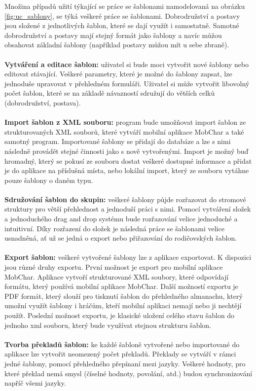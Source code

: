 \documentclass[thesis=B,czech]{resources/FITthesis}[2012/06/26]
\begin{document}
Množina případů užití týkající se práce se šablonami namodelovaná na obrázku \ref{fig:uc_sablony}, se týká veškeré práce se šablonami. Dobrodružství a postavy jsou složené z jednotlivých šablon, které se dají využít i samostatně. Samotné dobrodružství a postavy mají stejný formát jako šablony a navíc můžou obsahovat základní šablony (například postavy můžou mít u sebe zbraně).\\
\\
\textbf{Vytváření a editace šablon:} uživatel si bude moci vytvořit nové šablony nebo editovat stávající. Veškeré parametry, které je možné do šablony zapsat, lze jednoduše upravovat v přehledném formuláři. Uživatel si může vytvořit libovolný počet šablon, které se na základě návazností sdružují do větších celků (dobrodružství, postava).\\
\\
\textbf{Import šablon z XML souboru:} program bude umožňovat import šablon ze strukturovaných XML souborů, které vytváří mobilní aplikace MobChar a také samotný program. Importované šablony se přidají do databáze a lze s nimi následně provádět stejné činnosti jako s nově vytvořenými. Import je možný buď hromadný, který se pokusí ze souboru dostat veškeré dostupné informace a přidat je do aplikace na příslušná místa, nebo lokální import, který ze souboru vytáhne pouze šablony o daném typu.\\
\\
\textbf{Sdružování šablon do skupin:} veškeré šablony půjde rozřazovat do stromové struktury pro větší přehlednost a jednoduší práci s nimi. Pomocí vytváření složek a jednoduchého drag and drop systému bude rozřazování velice jednoduché a intuitivní. Díky rozřazení do složek je následná práce se šablonami velice usnadněná, ať už se jedná o export nebo přiřazování do rodičovských šablon.\\
\\
\textbf{Export šablon:} veškeré vytvořené šablony lze z aplikace exportovat. K dispozici jsou různé druhy exportu. První možnost je export pro mobilní aplikace MobChar. Aplikace vytvoří strukturované XML soubory, které odpovídají formátu, který používá mobilní aplikace MobChar. Další možností exportu je PDF formát, který slouží pro tisknutí šablon do přehledného almanachu, který umožní využít šablony i hráčům, kteří mobilní aplikaci nemají nebo ji nechtějí použít. Poslední možnost exportu, je klasické uložení celého stavu šablon do jednoho xml souboru, který bude využívat stejnou strukturu šablon. \\
\\
\textbf{Tvorba překladů šablon:} ke každé šabloně vytvořené nebo importované do aplikace lze vytvořit neomezený počet překladů. Překlady se vytváří v rámci jedné šablony, pomocí přehledného přepínaní mezi jazyky. Veškeré hodnoty, pro které překlad nemá smysl (číselné hodnoty, povolání, atd.) budou synchronizování napříč všemi jazyky.\\
\\
\end{document}
